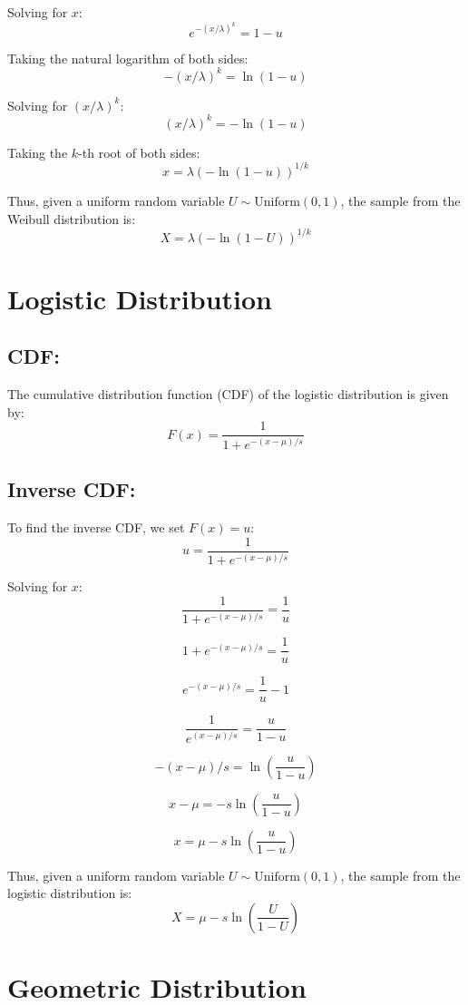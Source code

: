 \documentclass{article}
\begin{document}
Solving for \( x \):
\[
e^{-(x/\lambda)^k} = 1 - u
\]

Taking the natural logarithm of both sides:
\[
-(x/\lambda)^k = \ln(1 - u)
\]

Solving for \( (x/\lambda)^k \):
\[
(x/\lambda)^k = -\ln(1 - u)
\]

Taking the \( k \)-th root of both sides:
\[
x = \lambda (-\ln(1 - u))^{1/k}
\]

Thus, given a uniform random variable \( U \sim \text{Uniform}(0, 1) \), the sample from the Weibull distribution is:
\[
X = \lambda (-\ln(1 - U))^{1/k}
\]

\newpage

\section*{Logistic Distribution}

\subsection*{CDF:}
The cumulative distribution function (CDF) of the logistic distribution is given by:
\[
F(x) = \frac{1}{1 + e^{-(x-\mu)/s}}
\]

\subsection*{Inverse CDF:}
To find the inverse CDF, we set \( F(x) = u \):
\[
u = \frac{1}{1 + e^{-(x-\mu)/s}}
\]

Solving for \( x \):
\[
\frac{1}{1 + e^{-(x-\mu)/s}} = \frac{1}{u}
\]

\[
1 + e^{-(x-\mu)/s} = \frac{1}{u}
\]

\[
e^{-(x-\mu)/s} = \frac{1}{u} - 1
\]

\[
\frac{1}{e^{(x-\mu)/s}} = \frac{u}{1 - u}
\]

\[
-(x-\mu)/s = \ln\left(\frac{u}{1 - u}\right)
\]

\[
x - \mu = -s \ln\left(\frac{u}{1 - u}\right)
\]

\[
x = \mu - s \ln\left(\frac{u}{1 - u}\right)
\]

Thus, given a uniform random variable \( U \sim \text{Uniform}(0, 1) \), the sample from the logistic distribution is:
\[
X = \mu - s \ln\left(\frac{U}{1 - U}\right)
\]

\newpage

\section*{Geometric Distribution}
\end{document}
